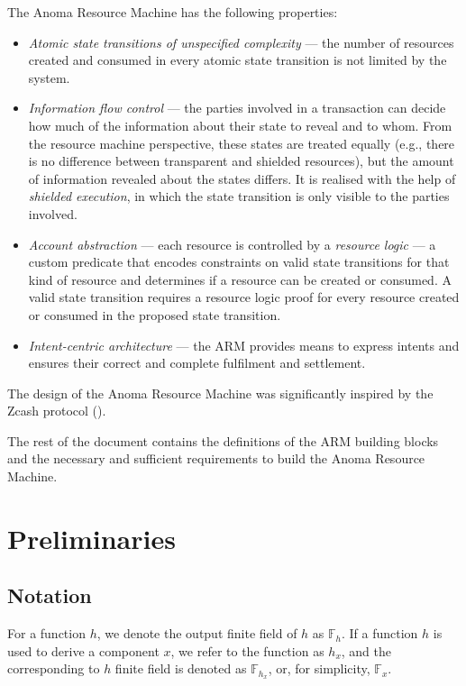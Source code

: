 \documentclass[
    11pt,            %
    techreport,        %
    affiltop,       %
]{art}
\begin{document}
The Anoma Resource Machine has the following properties:
\begin{itemize}
    \item \textit{Atomic state transitions of unspecified complexity} — the number of resources created and consumed in every atomic state transition is not limited by the system.
    \item \textit{Information flow control} — the parties involved in a transaction can decide how much of the information about their state to reveal and to whom. From the resource machine perspective, these states are treated equally (e.g., there is no difference between transparent and shielded resources), but the amount of information revealed about the states differs. It is realised with the help of \textit{shielded execution}, in which the state transition is only visible to the parties involved.
    \item \textit{Account abstraction} — each resource is controlled by a \textit{resource logic} — a custom predicate that encodes constraints on valid state transitions for that kind of resource and determines if a resource can be created or consumed. A valid state transition requires a resource logic proof for every resource created or consumed in the proposed state transition.
    \item \textit{Intent-centric architecture} — the ARM provides means to express intents and ensures their correct and complete fulfilment and settlement.
\end{itemize} 

The design of the Anoma Resource Machine was significantly inspired by the Zcash protocol (\cite{orchard}).

The rest of the document contains the definitions of the ARM building blocks and the necessary and sufficient requirements to build the Anoma Resource Machine. %

\section{Preliminaries}

\subsection{Notation}

For a function $h$, we denote the output finite field of $h$ as $\mathbb{F}_h$. If a function $h$ is used to derive a component $x$, we refer to the function as $h_x$, and the corresponding to $h$ finite field is denoted as $\mathbb{F}_{h_x}$, or, for simplicity, $\mathbb{F}_x$.
\end{document}
